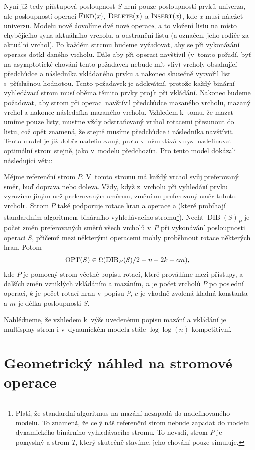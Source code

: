 Nyní již tedy přístupová posloupnost $S$ není pouze posloupností prvků
univerza, ale posloupností operací $\ope{Find}(x)$, $\ope{Delete}(x)$ a
$\ope{Insert}(x)$, kde $x$ musí náležet univerzu. Modelu nově dovolíme dvě
nové operace, a to vložení listu na místo chybějícího syna aktuálního vrcholu,
a odstranění listu (a označení jeho rodiče za aktuální vrchol). Po každém
stromu budeme vyžadovat, aby se při vykonávání operace  dotkl daného
vrcholu. Dále aby při operaci  navštívil (v~tomto pořadí, byť na
asymptotické chování tento požadavek nebude mít vliv) vrcholy obsahující
předchůdce a následníka vkládaného prvku a nakonec skutečně vytvořil list
s~příslušnou hodnotou. Tento požadavek je adekvátní, protože každý binární
vyhledávací strom musí oběma těmito prvky projít při vkládání. Nakonec budeme
požadovat, aby strom při operaci  navštívil předchůdce mazaného
vrcholu, mazaný vrchol a nakonec následníka mazaného vrcholu. Vzhledem k~tomu,
že mazat umíme pouze listy, musíme vždy odstraňovaný vrchol rotacemi přesunout
do listu, což opět znamená, že stejně musíme předchůdce i následníka navštívit.
Tento model je již dobře nadefinovaný, proto v~něm dává smysl nadefinovat optimální strom stejně, jako v~modelu předchozím.
Pro tento model \citet{multisplay} dokázali následující větu:

\begin{veta}
\def\dib{\operatorname{DIB}}
Mějme referenční strom $P$. V~tomto stromu má každý vrchol svůj preferovaný
směr, buď doprava nebo doleva. Vždy, když z~vrcholu při vyhledání prvku vyrazíme
jiným než preferovaným směrem, změníme preferovaný směr tohoto vrcholu. Strom
$P$ také podporuje rotace hran a operace  a  (které
probíhají standardním algoritmem binárního vyhledávacího stromu\footnote{Platí,
že standardní algoritmus na mazání nezapadá do nadefinovaného modelu. To
znamená, že celý náš referenční strom nebude zapadat do modelu dynamického
binárního vyhledávacího stromu. To nevadí, strom $P$ je pomyslný a strom
$T$, který skutečně stavíme, jeho chování pouze simuluje.}). Nechť $\dib(S)_P$ je
počet změn preferovaných směrů všech vrcholů v~$P$ při vykonávání posloupnosti
operací $S$, přičemž mezi některými operacemi mohly proběhnout rotace některých
hran. Potom $$\opt(S) \in \Omega(\dib_P(S)/2 - n - 2k + cm),$$ kde $P$ je
pomocný strom včetně popisu rotací, které provádíme mezi přístupy, a dalších
změn vzniklých vkládáním a mazáním, $n$ je počet vrcholů $P$ po poslední operaci, $k$
je počet rotací hran v~popisu $P$, $c$ je vhodně zvolená kladná konstanta a $m$
je délka posloupnosti $S$.  \end{veta}

Nahlédneme, že vzhledem k~výše uvedenému popisu mazání a vkládání je multisplay strom i v~dynamickém modelu stále $\log\log(n)$-kompetitivní. 

\section{Geometrický náhled na stromové operace}
